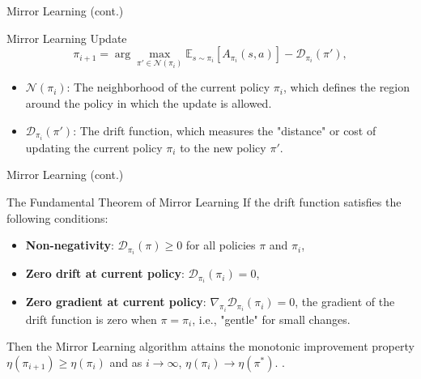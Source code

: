 \documentclass[9pt]{beamer}
\begin{document}
\begin{frame}{Mirror Learning (cont.)}
  \begin{block}{Mirror Learning Update}
  \begin{equation}
    \pi_{i+1} = \arg \max_{\pi' \in \mathcal{N}(\pi_i)} \mathbb{E}_{s \sim \pi_i} \left[ A_{\pi_i}(s, a) \right] - \mathcal{D}_{\pi_i}(\pi'),
  \end{equation}
  \end{block}
  
    \vspace{1em}  %
  \begin{itemize}
    \item \( \mathcal{N}(\pi_i) \): The neighborhood of the current policy \( \pi_i \), which defines the region around the policy in which the update is allowed.
    \vspace{1em}  %
    \item \( \mathcal{D}_{\pi_i}(\pi') \): The drift function, which measures the "distance" or cost of updating the current policy \( \pi_i \) to the new policy \( \pi' \).
  \end{itemize}
\end{frame}

\begin{frame}{Mirror Learning (cont.)}
  \begin{block}{The Fundamental Theorem of Mirror Learning}
    \vspace{1em}  %
    If the drift function satisfies the following conditions:
    \begin{itemize}
      \item \textbf{Non-negativity}: \( \mathcal{D}_{\pi_i}(\pi) \geq 0 \) for all policies \( \pi \) and \( \pi_i \),
      \item \textbf{Zero drift at current policy}: \( \mathcal{D}_{\pi_i}(\pi_i) = 0 \),
      \item \textbf{Zero gradient at current policy}: \( \nabla_{\pi_i} \mathcal{D}_{\pi_i}(\pi_i) = 0 \), the gradient of the drift function is zero when \( \pi = \pi_i \), i.e., "gentle" for small changes.
    \end{itemize}
    \vspace{1em}  %
    Then the Mirror Learning algorithm attains the monotonic improvement property \( \eta(\pi_{i+1}) \geq \eta(\pi_i) \) and as \( i \to \infty \), \( \eta(\pi_i) \to \eta(\pi^*) \). \cite{mirror2022}.
    \vspace{1em}  %
  \end{block}
\end{frame}
\end{document}
